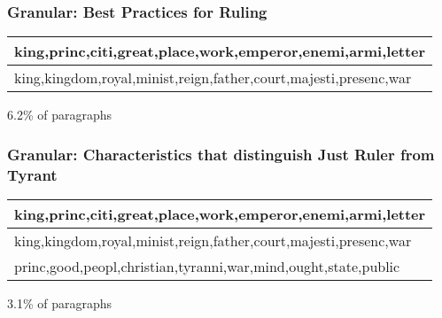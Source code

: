 \documentclass{beamer}
\numberwithin{equation}{section}
\begin{document}
\begin{frame}


\begin{center}
\end{center}

\end{frame}




\begin{frame}

\begin{center}
\end{center}

\end{frame}



\begin{frame}
\frametitle{Granular: Best Practices for Ruling}


\begin{tabular}{l}
\hline
king,princ,citi,great,place,work,emperor,enemi,armi,letter \\
\hline
\alert{king,kingdom,royal,minist,reign,father,court,majesti,presenc,war}
\end{tabular}

\vspace{0.5in}

6.2\% of paragraphs

\end{frame}



\begin{frame}

\begin{center}
\end{center}

\end{frame}


\begin{frame}
\frametitle{Granular: Characteristics that distinguish Just Ruler from Tyrant}


\begin{tabular}{l}
\hline
king,princ,citi,great,place,work,emperor,enemi,armi,letter \\
\hline
king,kingdom,royal,minist,reign,father,court,majesti,presenc,war\\
\alert{princ,good,peopl,christian,tyranni,war,mind,ought,state,public}\\
\end{tabular}

\vspace{0.5in}

3.1\% of paragraphs

\end{frame}
\end{document}
